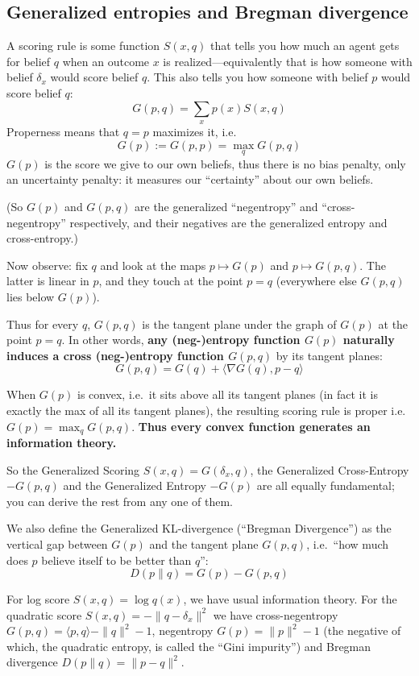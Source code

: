 \subsection{Generalized entropies and Bregman divergence}\label{agency:sec:bregman}

A scoring rule is some function $S(x, q)$ that tells you how much an agent gets for belief
$q$ when an outcome $x$ is realized---equivalently that is how someone with belief
$\delta_x$ would score belief $q$. This also tells you how someone with belief $p$ would
score belief $q$:
\[G(p,q)=\sum_x p(x)S(x,q)\]
Properness means that $q=p$ maximizes it, i.e.
\[G(p):=G(p,p)=\max_q G(p,q)\]
$G(p)$ is the score we give to our own beliefs, thus there is no bias penalty, only an
uncertainty penalty: it measures our ``certainty'' about our own beliefs.

(So $G(p)$ and $G(p,q)$ are the generalized ``negentropy'' and ``cross-negentropy''
respectively, and their negatives are the generalized entropy and cross-entropy.)

Now observe: fix $q$ and look at the maps $p\mapsto G(p)$ and $p\mapsto G(p,q)$. The latter
is linear in $p$, and they touch at the point $p=q$ (everywhere else $G(p,q)$ lies below
$G(p)$).

Thus for every $q$, $G(p,q)$ is the tangent plane under the graph of $G(p)$ at the point
$p=q$. In other words, \textbf{any (neg-)entropy function $G(p)$ naturally induces a cross
(neg-)entropy function $G(p,q)$} by its tangent planes:
\[G(p,q)=G(q)+\langle\nabla G(q), p-q\rangle\]

When $G(p)$ is convex, i.e.\ it sits above all its tangent planes (in fact it is exactly the
max of all its tangent planes), the resulting scoring rule is proper i.e.\
$G(p)=\max_q G(p,q)$. \textbf{Thus every convex function generates an information theory.}

So the Generalized Scoring $S(x,q)=G(\delta_x, q)$, the Generalized Cross-Entropy $-G(p,q)$
and the Generalized Entropy $-G(p)$ are all equally fundamental; you can derive the rest
from any one of them.

We also define the Generalized KL-divergence (``Bregman Divergence'') as the vertical gap
between $G(p)$ and the tangent plane $G(p,q)$, i.e.\ ``how much does $p$ believe itself to
be better than $q$'':
\[D(p\parallel q)=G(p)-G(p,q)\]

For log score $S(x, q)=\log q(x)$, we have usual information theory. For the quadratic score
$S(x,q)=-\|q-\delta_x\|^2$ we have cross-negentropy $G(p,q)=\langle p, q\rangle-\|q\|^2-1$,
negentropy $G(p)=\|p\|^2-1$ (the negative of which, the quadratic entropy, is called the
``Gini impurity'') and Bregman divergence $D(p\parallel q)=\|p-q\|^2$.


